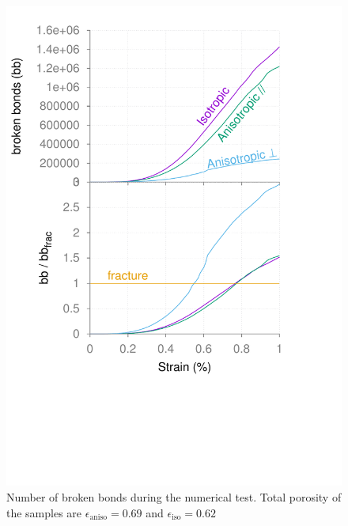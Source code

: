 \documentclass{article}
\begin{document}
	\begin{figure}[ht]
		\centering
		\includegraphics[width=\linewidth]{figures/sup_fig2}
		\caption{Number of broken bonds during the numerical test. Total porosity of the samples are $\epsilon_\text{aniso} = 0.69$ and $\epsilon_\text{iso} = 0.62$}
	\end{figure}
\end{document}
